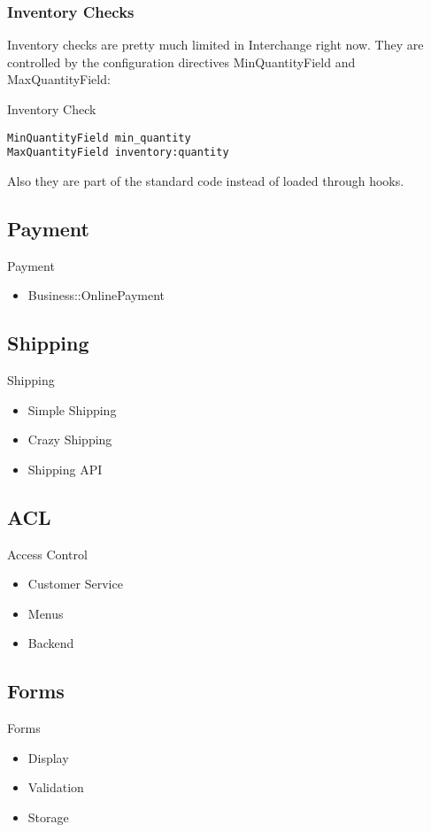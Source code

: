 \subsubsection{Inventory Checks}
Inventory checks are pretty much limited in Interchange right now.
They are controlled by the configuration directives MinQuantityField
and MaxQuantityField:
\begin{frame}[fragile]{Inventory Check}
\begin{lstlisting}
MinQuantityField min_quantity
MaxQuantityField inventory:quantity 
\end{lstlisting}
\end{frame}
Also they are part of the standard code instead of loaded through
hooks.

\subsection{Payment}
\begin{frame}{Payment}
\begin{itemize}
\item Business::OnlinePayment
\end{itemize}
\end{frame}

\subsection{Shipping}
\begin{frame}{Shipping}
\begin{itemize}
\item Simple Shipping
\item Crazy Shipping
\item Shipping API
\end{itemize}
\end{frame}

\subsection{ACL}
\begin{frame}{Access Control}
\begin{itemize}
\item Customer Service
\item Menus
\item Backend
\end{itemize}
\end{frame}

\subsection{Forms}
\begin{frame}{Forms}
\begin{itemize}
\item Display
\item Validation
\item Storage
\end{itemize}
\end{frame}

